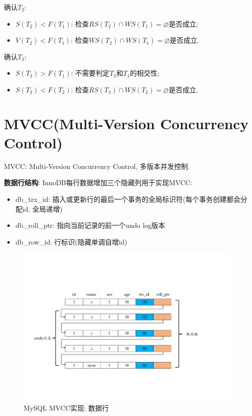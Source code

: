 确认$T_2$:
\begin{itemize}
  \item $S(T_2)<F(T_1)$: 检查$RS(T_2)\cap WS(T_1) = \varnothing$是否成立;
  \item $V(T_2)<F(T_1)$: 检查$WS(T_2) \cap WS(T_1) = \varnothing$是否成立.
\end{itemize}

确认$T_3$:
\begin{itemize}
  \item $S(T_3)>F(T_1)$: 不需要判定$T_3$和$T_1$的相交性;
  \item $S(T_3)<F(T_2)$: 检查$RS(T_3)\cap WS(T_2) = \varnothing$是否成立.
\end{itemize}

\section{MVCC(Multi-Version Concurrency Control)}

MVCC: Multi-Version Concurrency Control, 多版本并发控制.

\textbf{数据行结构}:
InnoDB每行数据增加三个隐藏列用于实现MVCC:
\begin{itemize}
  \item db\_trx\_id: 插入或更新行的最后一个事务的全局标识符(每个事务创建都会分配id, 全局递增)
  \item db\_roll\_ptr: 指向当前记录的前一个undo log版本
  \item db\_row\_id: 行标识(隐藏单调自增id)
\end{itemize}

\begin{figure}[H]
    \centering
    \includegraphics[width=.8\textwidth]{figure/MVCC.pdf}
    \caption{MySQL MVCC实现: 数据行}
\end{figure}

